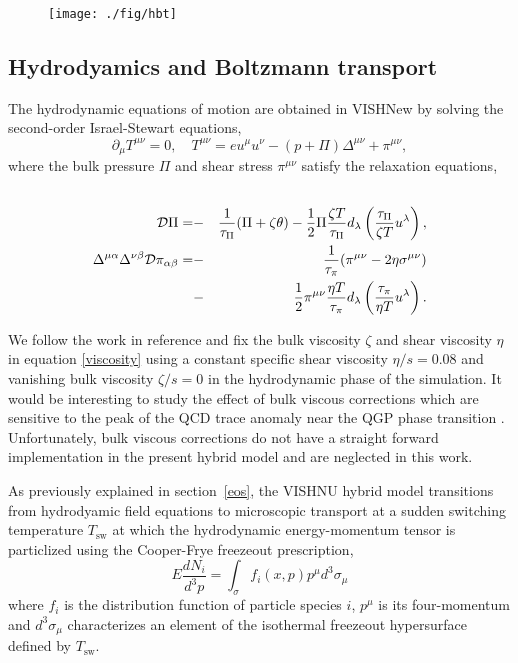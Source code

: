 \documentclass[aps,prc,reprint,amsmath,nofootinbib,superscriptaddress]{revtex4-1}
\begin{document}
\begin{figure*}[t]
  \texttt{[image: ./fig/hbt]}
  \caption{
    \label{fig:spectra}
  }
\end{figure*}

\subsection{Hydrodyamics and Boltzmann transport}

The hydrodynamic equations of motion are obtained in VISHNew by solving the second-order Israel-Stewart equations,
\begin{equation}
 \partial_\mu T^{\mu\nu} = 0, \quad T^{\mu\nu} = e u^\mu u^\nu - (p + \Pi) \Delta^{\mu\nu} + \pi^{\mu\nu},
\end{equation}
where the bulk pressure $\Pi$ and shear stress $\pi^{\mu\nu}$ satisfy the relaxation equations,
\begin{eqnarray}
 \label{viscosity}
 \cr \mathcal{D}\Pi = &-&\frac{1}{\tau_\Pi}(\Pi + \zeta \theta) - \frac{1}{2} \Pi \frac{\zeta T}{\tau_\Pi}d_\lambda \left(\frac{\tau_\Pi}{\zeta T} u^\lambda \right), \nonumber \\
  \Delta^{\mu\alpha} \Delta^{\nu\beta} \mathcal{D}\pi_{\alpha\beta} = &-&\frac{1}{\tau_\pi}(\pi^{\mu\nu} - 2 \eta \sigma^{\mu\nu}) \\
  &-& \frac{1}{2} \pi^{\mu\nu} \frac{\eta T}{\tau_\pi} d_\lambda\left(\frac{\tau_\pi}{\eta T} u^\lambda \right ).
\end{eqnarray}

We follow the work in reference \cite{?} and fix the bulk viscosity $\zeta$ and shear viscosity $\eta$ in equation \eqref{viscosity} using a constant specific shear viscosity $\eta/s=0.08$ 
and vanishing bulk viscosity $\zeta/s=0$ in the hydrodynamic phase of the simulation. It would be interesting to study the effect of bulk viscous corrections which are sensitive to 
the peak of the QCD trace anomaly near the QGP phase transition \cite{?}. Unfortunately, bulk viscous corrections do not have a straight forward implementation in the present hybrid model 
and are neglected in this work. 

As previously explained in section \,\ref{eos}, the VISHNU hybrid model transitions from hydrodyamic field equations to microscopic transport at a sudden switching temperature $T_\text{sw}$ 
at which the hydrodynamic energy-momentum tensor is particlized using the Cooper-Frye freezeout prescription,
\begin{equation}
 E\frac{dN_i}{d^3p} = \int_\sigma f_i(x,p) p^\mu d^3\sigma_\mu
 \label{cooper-frye}
\end{equation}
where $f_i$ is the distribution function of particle species $i$, $p^\mu$ is its four-momentum and $d^3\sigma_\mu$ characterizes an element of the isothermal freezeout 
hypersurface defined by $T_\text{sw}$.
\end{document}
